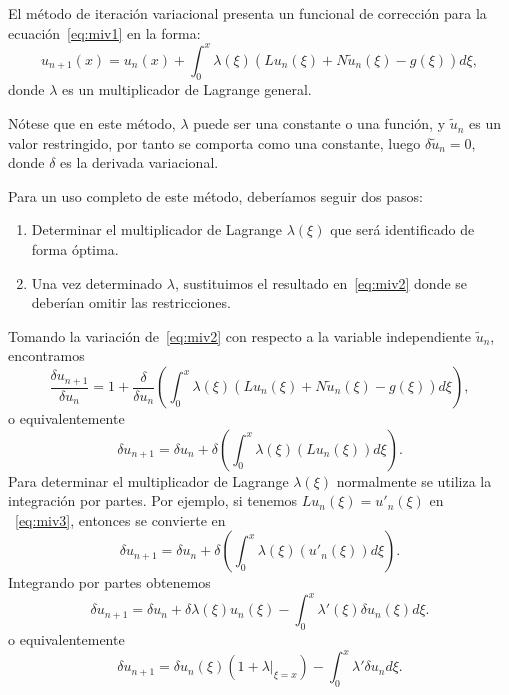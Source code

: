 El método de iteración variacional presenta un funcional de corrección para la ecuación~\eqref{eq:miv1} en la forma:
\begin{equation}\label{eq:miv2}
	u_{n+1}(x) = u_n(x) + \int_{0}^{x} \lambda(\xi)(Lu_n(\xi) + N\tilde{u}_n(\xi) - g(\xi))d\xi,
\end{equation}
donde $\lambda$ es un multiplicador de Lagrange general.
\begin{observacion}
	Nótese que en este método, $\lambda$ puede ser una constante o una función, y $\tilde{u}_n$ es un valor restringido, por tanto se comporta como una constante, luego $\delta \tilde{u}_n = 0$, donde $\delta$ es la derivada variacional.
\end{observacion}
Para un uso completo de este método, deberíamos seguir dos pasos:
\begin{enumerate}
	\item Determinar el multiplicador de Lagrange $\lambda(\xi)$ que será identificado de forma óptima.
	\item Una vez determinado $\lambda$, sustituimos el resultado en~\eqref{eq:miv2} donde se deberían omitir las restricciones.
\end{enumerate}
Tomando la variación de~\eqref{eq:miv2} con respecto a la variable independiente $\tilde{u}_n$, encontramos
\begin{equation}
	\dfrac{\delta u_{n+1}}{\delta u_n} = 1 + \dfrac{\delta}{\delta u_n}(\int_{0}^{x} \lambda(\xi)(Lu_n(\xi)+N\tilde{u}_n(\xi)-g(\xi))d\xi),
\end{equation}
o equivalentemente
\begin{equation}\label{eq:miv3}
	\delta u_{n+1} = \delta u_n + \delta (\int_{0}^{x} \lambda (\xi)(Lu_n(\xi))d\xi).
\end{equation}
Para determinar el multiplicador de Lagrange $\lambda(\xi)$ normalmente se utiliza la integración por partes. Por ejemplo, si tenemos $Lu_n(\xi) = u'_n(\xi)$ en ~\eqref{eq:miv3}, entonces se convierte en
\begin{equation}
	\delta u_{n+1} = \delta u_n + \delta (\int_{0}^{x} \lambda (\xi)(u'_n(\xi))d\xi).
\end{equation}
Integrando por partes obtenemos
\begin{equation}
	\delta u_{n+1} = \delta u_n + \delta \lambda(\xi)u_n(\xi) - \int_{0}^{x} \lambda'(\xi) \delta u_n(\xi)d\xi.
\end{equation}
o equivalentemente
\begin{equation}
	\delta u_{n+1} = \delta u_n(\xi)(1 + \lambda |_{\xi = x}) - \int_{0}^{x} \lambda'\delta u_nd\xi.
\end{equation}
